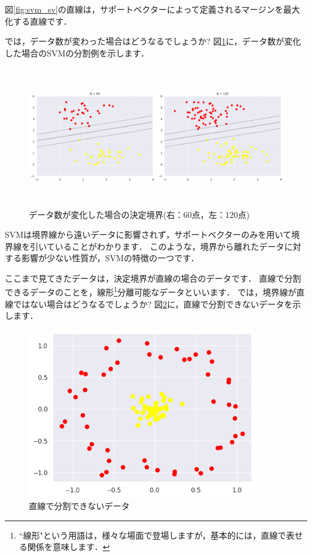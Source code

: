 \documentclass{jarticle}
\begin{document}
図\ref{fig:svm_sv}の直線は，サポートベクターによって定義されるマージンを最大化する直線です．

では，データ数が変わった場合はどうなるでしょうか?
図\ref{fig:svm_data2}に，データ数が変化した場合のSVMの分割例を示します．

\begin{figure}[H]
  \centering
  \includegraphics[height=6.1cm]{fig/svm_diff_sample_amount.png}
  \caption{データ数が変化した場合の決定境界(右：60点，左：120点)}
  \label{fig:svm_data2}
\end{figure}

SVMは境界線から遠いデータに影響されず，サポートベクターのみを用いて境界線を引いていることがわかります．
このような，境界から離れたデータに対する影響が少ない性質が，SVMの特徴の一つです．

ここまで見てきたデータは，決定境界が直線の場合のデータです．
直線で分割できるデータのことを，線形\footnote{``線形"という用語は，様々な場面で登場しますが，基本的には，直線で表せる関係を意味します．}分離可能なデータといいます．
では，境界線が直線ではない場合はどうなるでしょうか?
図\ref{fig:not_linear}に，直線で分割できないデータを示します．

\begin{figure}[H]
  \centering
  \includegraphics[width=10cm]{fig/svm_not_linear.png}
  \caption{直線で分割できないデータ}
  \label{fig:not_linear}
\end{figure}
\end{document}
